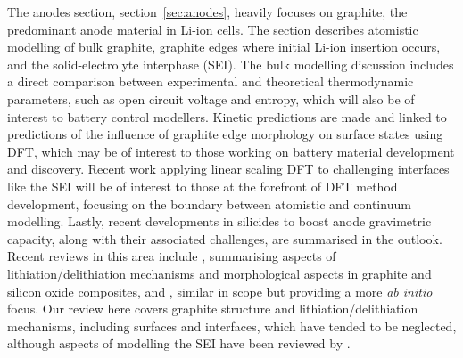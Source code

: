 \documentclass[../main.tex]{subfiles}
\begin{document}
The anodes section, section~\ref{sec:anodes}, heavily focuses on graphite, the predominant anode material in Li-ion cells. The section describes atomistic modelling of bulk graphite, graphite edges where initial Li-ion insertion occurs, and the solid-electrolyte interphase (SEI). The bulk modelling discussion includes a direct comparison between experimental and theoretical thermodynamic parameters, such as open circuit voltage and entropy, which will also be of interest to battery control modellers. Kinetic predictions are made and linked to predictions of the influence of graphite edge morphology on surface states using DFT, which may be of interest to those working on battery material development and discovery. Recent work applying linear scaling DFT to challenging interfaces like the SEI will be of interest to those at the forefront of DFT method development, focusing on the boundary between atomistic and continuum modelling. Lastly, recent developments in silicides to boost anode gravimetric capacity, along with their associated challenges, are summarised in the outlook. Recent reviews in this area include \citeauthor{asenbauer_success_2020} \cite{asenbauer_success_2020}, summarising aspects of lithiation/delithiation mechanisms and morphological aspects in graphite and silicon oxide composites, and \citeauthor{ZHANG2021147} \cite{ZHANG2021147}, similar in scope but providing a more \textit{ab initio} focus. Our review here covers graphite structure and lithiation/delithiation mechanisms, including surfaces and interfaces, which have tended to be neglected, although aspects of modelling the SEI have been reviewed by \citeauthor{Wang2018} \cite{Wang2018}.
\end{document}
